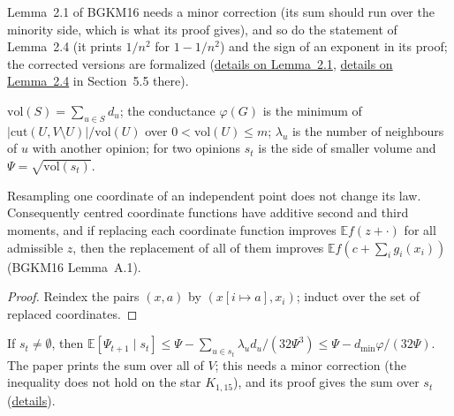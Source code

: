 Lemma~2.1 of BGKM16 needs a minor correction (its sum should run over the minority side, which is
what its proof gives), and so do the statement of Lemma~2.4 (it prints $1/n^2$ for $1-1/n^2$)
and the sign of an exponent in its proof; the corrected versions are formalized
(\href{https://github.com/formal-dynamics/leanamics/blob/main/voter/FORMALIZATION_DIFFERENCES.md#51-lemma-21-of-bgkm16-needs-a-minor-correction}{details
on Lemma~2.1},
\href{https://github.com/formal-dynamics/leanamics/blob/main/voter/FORMALIZATION_DIFFERENCES.md#5-consensus-time-via-conductance-berenbrinkgiakkoupiskermarrecmallmann-trenn}{details
on Lemma~2.4} in Section~5.5 there).
\begin{definition}\label{def:conductance}
\leanok
$\mathrm{vol}(S)=\sum_{u\in S}d_u$; the conductance $\varphi(G)$ is the minimum of
$|\mathrm{cut}(U,V\setminus U)|/\mathrm{vol}(U)$ over $0<\mathrm{vol}(U)\le m$; $\lambda_u$ is the
number of neighbours of $u$ with another opinion; for two opinions $s_t$ is the side of smaller
volume and $\Psi=\sqrt{\mathrm{vol}(s_t)}$.
\end{definition}
\begin{lemma}\label{lem:indep}
\leanok
Resampling one coordinate of an independent point does not change its law. Consequently
centred coordinate functions have additive second and third moments, and if replacing each
coordinate function improves $\mathbb{E}f(z+\cdot)$ for all admissible $z$, then the replacement of
all of them improves $\mathbb{E}f(c+\sum_i g_i(x_i))$ (BGKM16 Lemma~A.1).
\end{lemma}
\begin{proof}\leanok
Reindex the pairs $(x,a)$ by $(x[i\mapsto a],x_i)$; induct over the set of replaced coordinates.
\end{proof}
\begin{lemma}\label{lem:bgkm-21}
\leanok{}
If $s_t\neq\emptyset$, then
$\mathbb{E}[\Psi_{t+1}\mid s_t]\le\Psi-\sum_{u\in s_t}\lambda_u d_u/(32\Psi^3)
\le\Psi-d_{\min}\varphi/(32\Psi)$. The paper prints the sum over all of $V$; this needs a minor correction (the
inequality does not hold on the star $K_{1,15}$), and its proof gives the sum over $s_t$
(\href{https://github.com/formal-dynamics/leanamics/blob/main/voter/FORMALIZATION_DIFFERENCES.md#51-lemma-21-of-bgkm16-needs-a-minor-correction}{details}).
\end{lemma}
